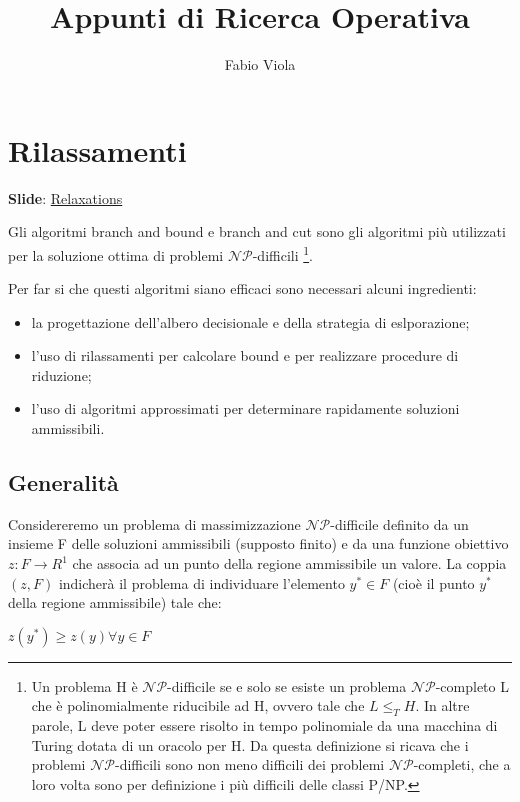 \documentclass[11pt]{book}
\title{Appunti di Ricerca Operativa}
\author{Fabio Viola}
\date{}
\begin{document}
\chapter{Rilassamenti}

\scriptsize
{\bf Slide}:
\href{http://www.or.deis.unibo.it/staff_pages/martello/Chapter9.zip}{Relaxations}
\normalsize
\vspace{20pt}

Gli algoritmi branch and bound e branch and cut sono gli algoritmi
pi\`u utilizzati per la soluzione ottima di problemi
$\mathcal{NP}$-difficili \footnote{Un problema H \`e
  $\mathcal{NP}$-difficile se e solo se esiste un problema
  $\mathcal{NP}$-completo L che \`e polinomialmente riducibile ad H,
  ovvero tale che $L \leq_T H$. In altre parole, L deve poter essere
  risolto in tempo polinomiale da una macchina di Turing dotata di un
  oracolo per H. Da questa definizione si ricava che i problemi
  $\mathcal{NP}$-difficili sono non meno difficili dei problemi
  $\mathcal{NP}$-completi, che a loro volta sono per definizione i più
  difficili delle classi P/NP.}.


Per far si che questi algoritmi siano efficaci sono necessari alcuni
ingredienti:
\begin{itemize}
\item la progettazione dell'albero decisionale e della strategia di
  eslporazione;
\item l'uso di rilassamenti per calcolare bound e per realizzare
  procedure di riduzione;
\item l'uso di algoritmi approssimati per determinare rapidamente
  soluzioni ammissibili.
\end{itemize}

\section{Generalit\`a}

Considereremo un problema di massimizzazione $\mathcal{NP}$-difficile definito da
un insieme F delle soluzioni ammissibili (supposto finito) e da una
funzione obiettivo $z:F \rightarrow R^1$ che associa ad un punto della
regione ammissibile un valore. La coppia $(z,F)$ indicher\`a il
problema di individuare l'elemento $y^* \in F$ (cio\`e il punto $y^*$
della regione ammissibile) tale che:

\begin{center}
$z(y^*) \geq z(y) \forall y \in F$
\end{center}
\end{document}
